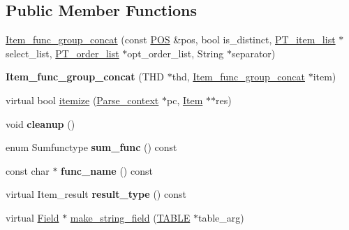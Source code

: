 \subsection*{Public Member Functions}
\begin{DoxyCompactItemize}
\item 
\mbox{\hyperlink{classItem__func__group__concat_ab54304bca3e3cff5a1544f4c0fb19fa7}{Item\+\_\+func\+\_\+group\+\_\+concat}} (const \mbox{\hyperlink{structYYLTYPE}{P\+OS}} \&pos, bool is\+\_\+distinct, \mbox{\hyperlink{classPT__item__list}{P\+T\+\_\+item\+\_\+list}} $\ast$select\+\_\+list, \mbox{\hyperlink{classPT__order__list}{P\+T\+\_\+order\+\_\+list}} $\ast$opt\+\_\+order\+\_\+list, String $\ast$separator)
\item 
\mbox{\label{classItem__func__group__concat_ab8ad432237f85f404df5a7c18729ede1}} 
{\bfseries Item\+\_\+func\+\_\+group\+\_\+concat} (T\+HD $\ast$thd, \mbox{\hyperlink{classItem__func__group__concat}{Item\+\_\+func\+\_\+group\+\_\+concat}} $\ast$item)
\item 
virtual bool \mbox{\hyperlink{classItem__func__group__concat_a8f71da39da2da3663cab3357ff4f8e9d}{itemize}} (\mbox{\hyperlink{structParse__context}{Parse\+\_\+context}} $\ast$pc, \mbox{\hyperlink{classItem}{Item}} $\ast$$\ast$res)
\item 
\mbox{\label{classItem__func__group__concat_aef43cf69562ec00eac8e68c9f7995e18}} 
void {\bfseries cleanup} ()
\item 
\mbox{\label{classItem__func__group__concat_a367b76a00038bcf2767ff217a0443784}} 
enum Sumfunctype {\bfseries sum\+\_\+func} () const
\item 
\mbox{\label{classItem__func__group__concat_ada3a531f0f4b413f897095739fe2dccb}} 
const char $\ast$ {\bfseries func\+\_\+name} () const
\item 
\mbox{\label{classItem__func__group__concat_a731a47b3cfb15ad96421f8ef1016ef1e}} 
virtual Item\+\_\+result {\bfseries result\+\_\+type} () const
\item 
virtual \mbox{\hyperlink{classField}{Field}} $\ast$ \mbox{\hyperlink{classItem__func__group__concat_ae472eb4f6eb3190f8baa326054acf9f8}{make\+\_\+string\+\_\+field}} (\mbox{\hyperlink{structTABLE}{T\+A\+B\+LE}} $\ast$table\+\_\+arg)
$$
\end{DoxyCompactItemize}
